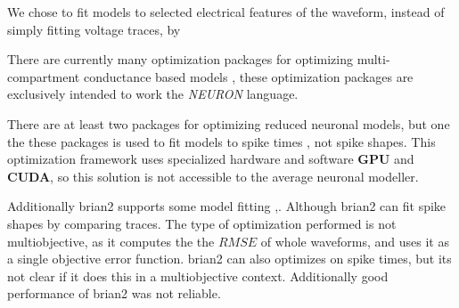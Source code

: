 We chose to fit models to selected electrical features of the waveform, instead of simply fitting voltage traces, by 


There are currently many optimization packages for optimizing multi-compartment conductance based models \cite{friedrich2014flexible} \cite{bluepyopt} \cite{neurotune},  these optimization packages are exclusively intended to work  the  \emph{NEURON} language.

There are at least two packages for optimizing reduced neuronal models, but one the these packages is used to fit models to spike times \cite{rossant2010automatic}, not spike shapes. This optimization framework uses specialized hardware and software \textbf{GPU} and \textbf{CUDA}, so this solution is not accessible to the average neuronal modeller.

Additionally brian2 supports some model fitting
\cite{brian2modelfitting},\cite{stimberg2019brian}. Although brian2 can fit spike shapes by comparing traces. The type of optimization performed is not multiobjective, as it computes the the $RMSE$ of whole waveforms, and uses it as a single objective error function. brian2 can also optimizes on spike times, but its not clear if it does this in a multiobjective context. Additionally good performance of brian2 was not reliable.





